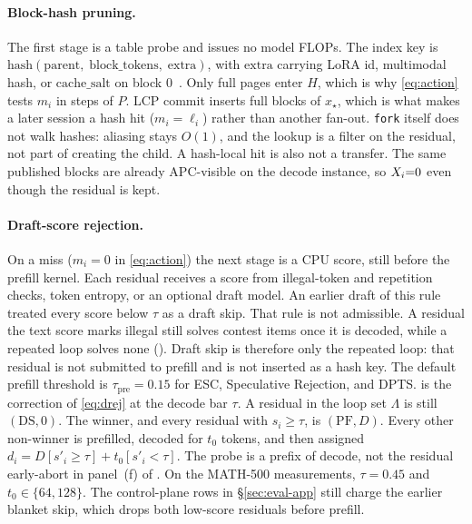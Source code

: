 \paragraph{Block-hash pruning.}
The first stage is a table probe and issues no model FLOPs.
The index key is $\mathrm{hash}(\mathrm{parent},\;\mathrm{block\_tokens},\;\mathrm{extra})$, with $\mathrm{extra}$ carrying LoRA id, multimodal hash, or $\mathrm{cache\_salt}$ on block $0$~\cite{vllm}.
Only full pages enter $H$, which is why \eqref{eq:action} tests $m_i$ in steps of $P$.
LCP commit inserts full blocks of $x_\star$, which is what makes a later session a hash hit ($m_i=\ell_i$) rather than another fan-out.
\texttt{fork} itself does not walk hashes: aliasing stays $O(1)$, and the lookup is a filter on the residual, not part of creating the child.
A hash-local hit is also not a transfer.
The same published blocks are already APC-visible on the decode instance, so $X_i{=}0$ even though the residual is kept.

\paragraph{Draft-score rejection.}
On a miss ($m_i=0$ in \eqref{eq:action}) the next stage is a CPU score, still before the prefill kernel.
Each residual receives a score from illegal-token and repetition checks, token entropy, or an optional draft model.
An earlier draft of this rule treated every score below $\tau$ as a draft skip.
That rule is not admissible.
A residual the text score marks illegal still solves contest items once it is decoded, while a repeated loop solves none ().
Draft skip is therefore only the repeated loop: that residual is not submitted to prefill and is not inserted as a hash key.
The default prefill threshold is $\tau_{\mathrm{pre}}{=}0.15$ for ESC, Speculative Rejection, and DPTS.
 is the correction of \eqref{eq:drej} at the decode bar $\tau$.
A residual in the loop set $\Lambda$ is still $(\mathrm{DS},0)$.
The winner, and every residual with $s_i\ge\tau$, is $(\mathrm{PF},D)$.
Every other non-winner is prefilled, decoded for $t_0$ tokens, and then assigned $d_i=D[s'_i\ge\tau]+t_0[s'_i<\tau]$.
The probe is a prefix of decode, not the residual early-abort in panel~(f) of .
On the MATH-500 measurements, $\tau{=}0.45$ and $t_0\in\{64,128\}$.
The control-plane rows in \S\ref{sec:eval-app} still charge the earlier blanket skip, which drops both low-score residuals before prefill.

